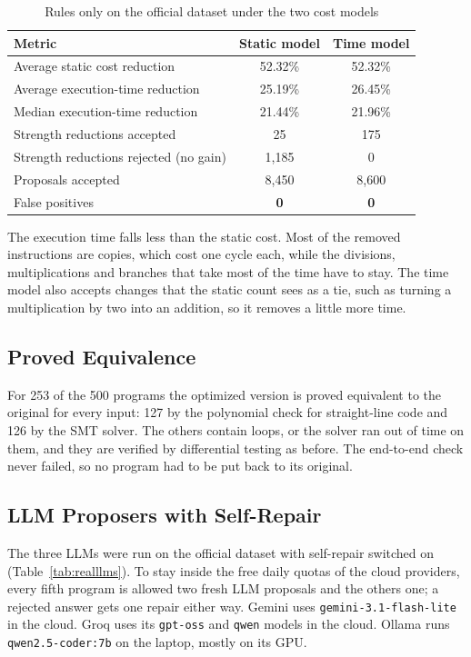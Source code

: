 \documentclass[12pt,a4paper]{report}
\begin{document}
\begin{table}[H]
\centering
\caption{Rules only on the official dataset under the two cost models}
\label{tab:costmodels}
\small
\begin{tabular}{|l|c|c|}
\hline
\textbf{Metric} & \textbf{Static model} & \textbf{Time model} \\
\hline
Average static cost reduction & 52.32\% & 52.32\% \\
\hline
Average execution-time reduction & 25.19\% & 26.45\% \\
\hline
Median execution-time reduction & 21.44\% & 21.96\% \\
\hline
Strength reductions accepted & 25 & 175 \\
\hline
Strength reductions rejected (no gain) & 1,185 & 0 \\
\hline
Proposals accepted & 8,450 & 8,600 \\
\hline
False positives & \textbf{0} & \textbf{0} \\
\hline
\end{tabular}
\end{table}

The execution time falls less than the static cost. Most of the removed instructions are copies, which cost one cycle each, while the divisions, multiplications and branches that take most of the time have to stay. The time model also accepts changes that the static count sees as a tie, such as turning a multiplication by two into an addition, so it removes a little more time.

\subsection{Proved Equivalence}

For 253 of the 500 programs the optimized version is proved equivalent to the original for every input: 127 by the polynomial check for straight-line code and 126 by the SMT solver. The others contain loops, or the solver ran out of time on them, and they are verified by differential testing as before. The end-to-end check never failed, so no program had to be put back to its original.

\subsection{LLM Proposers with Self-Repair}

The three LLMs were run on the official dataset with self-repair switched on (Table~\ref{tab:realllms}). To stay inside the free daily quotas of the cloud providers, every fifth program is allowed two fresh LLM proposals and the others one; a rejected answer gets one repair either way. Gemini uses \texttt{gemini-3.1-flash-lite} in the cloud. Groq uses its \texttt{gpt-oss} and \texttt{qwen} models in the cloud. Ollama runs \texttt{qwen2.5-coder:7b} on the laptop, mostly on its GPU.
\end{document}
